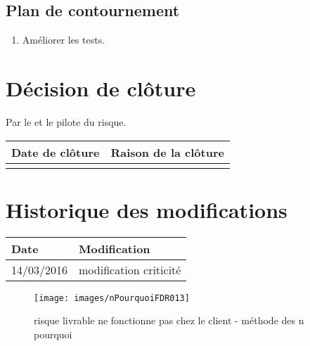 \flushleft
\subsection*{Plan de contournement}

\begin{enumerate}
	\item Améliorer les tests. 
\end{enumerate}

\section*{Décision de clôture}
Par le \CP{} et le pilote du risque.
\begin{table}[H]
\centering
	\begin{tabularx}{16.8cm}{|X|X|}
	\hline
	\rowcolor{gray!40} Date de clôture & Raison de la clôture \\
	\hline
	  & \\
	\hline
	\end{tabularx}
\end{table}

\section*{Historique des modifications}
\begin{table}[H]
\centering
	\begin{tabularx}{16.8cm}{|X|X|}
	\hline
	\rowcolor{gray!40} Date & Modification \\
	\hline
	 14/03/2016 & modification criticité\\
	\hline
	\end{tabularx}
\end{table}
\newpage


\begin{figure}
	\centering
	\texttt{[image: images/nPourquoiFDR013]}
	\caption{\label{livrable fonctionne pas client}risque livrable ne fonctionne pas chez le client - méthode des n pourquoi}
\end{figure}